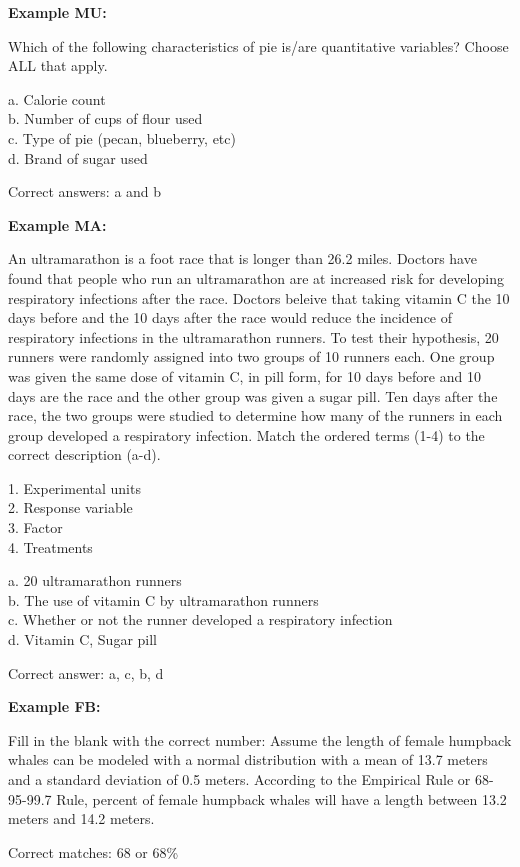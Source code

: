 \documentclass[11pt,a4paper,oldfontcommands,openany]{memoir}
\numberwithin{equation}{section} %
\begin{document}
\begin{framed}
\textbf{Example MU:}

Which of the following characteristics of pie is/are quantitative variables? Choose ALL that apply.

a. Calorie count\\
b. Number of cups of flour used\\
c. Type of pie (pecan, blueberry, etc)\\
d. Brand of sugar used

Correct answers: a and b
\end{framed}

\begin{framed}
\textbf{Example MA:}

An ultramarathon is a foot race that is longer than 26.2 miles. Doctors have found that people who run an ultramarathon are at increased risk for developing respiratory infections after the race. Doctors beleive that taking vitamin C the 10 days before and the 10 days after the race would reduce the incidence of respiratory infections in the ultramarathon runners. To test their hypothesis, 20 runners were randomly assigned into two groups of 10 runners each. One group was given the same dose of vitamin C, in pill form, for 10 days before and 10 days are the race and the other group was given a sugar pill. Ten days after the race, the two groups were studied to determine how many of the runners in each group developed a respiratory infection. Match the ordered terms (1-4) to the correct description (a-d).

1. Experimental units\\
2. Response variable\\
3. Factor\\
4. Treatments

a. 20 ultramarathon runners\\
b. The use of vitamin C by ultramarathon runners\\
c. Whether or not the runner developed a respiratory infection\\
d. Vitamin C, Sugar pill

Correct answer: a, c, b, d
\end{framed}

\begin{framed}
\textbf{Example FB:}

Fill in the blank with the correct number: Assume the length of female humpback whales can be modeled with a normal distribution with a mean of 13.7 meters and a standard deviation of 0.5 meters. According to the Empirical Rule or 68-95-99.7 Rule, \underline{\hspace{2cm}} percent of female humpback whales will have a length between 13.2 meters and 14.2 meters.

Correct matches: 68 or 68\%
\end{framed}
\end{document}
